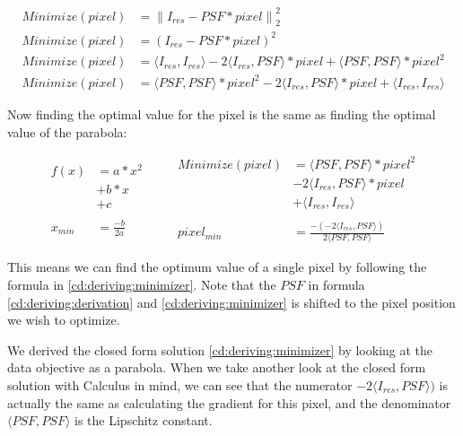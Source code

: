 \begin{equation} \label{cd:deriving:derivation}
\begin{split}
Minimize(pixel) & = \left \| I_{res} - PSF * pixel \right \|_2^2\\
Minimize(pixel) & = (I_{res} - PSF * pixel)^2\\
Minimize(pixel) & = \langle I_{res}, I_{res} \rangle - 2\langle I_{res},PSF\rangle * pixel + \langle PSF, PSF \rangle * pixel^2\\
Minimize(pixel) & = \langle PSF, PSF \rangle * pixel^2 - 2\langle I_{res},PSF\rangle * pixel + \langle I_{res}, I_{res} \rangle
\end{split}
\end{equation}

Now finding the optimal value for the pixel is the same as finding the optimal value of the parabola:

\begin{equation} \label{cd:deriving:minimizer}
\begin{split}
f(x) & = a*x^2 \\
 & + b*x \\
 & + c\\
 \\
x_{min} & = \frac{-b}{2a}
\end{split}
\quad \quad
\begin{split}
Minimize(pixel) & = \langle PSF, PSF \rangle * pixel^2 \\
 & - 2\langle I_{res},PSF\rangle * pixel \\
 &+ \langle I_{res}, I_{res} \rangle\\
 \\
pixel_{min} & = \frac{-(-2\langle I_{res},PSF\rangle)}{2\langle PSF, PSF \rangle}
\end{split}
\end{equation}

This means we can find the optimum value of a single pixel by following the formula in \eqref{cd:deriving:minimizer}. Note that the $PSF$ in formula \eqref{cd:deriving:derivation} and \eqref{cd:deriving:minimizer} is shifted to the pixel position we wish to optimize.

We derived the closed form solution \eqref{cd:deriving:minimizer} by looking at the data objective as a parabola. When we take another look at the closed form solution with Calculus in mind, we can see that the numerator $-2\langle I_{res},PSF\rangle)$ is actually the same as calculating the gradient for this pixel, and the denominator $\langle PSF, PSF \rangle$ is the Lipschitz constant. 

